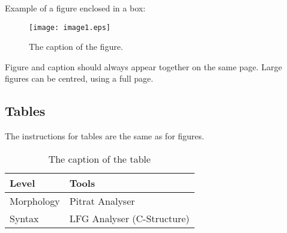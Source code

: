 \documentclass[10pt, a4paper]{article}
\begin{document}
Example of a figure enclosed in a box:

\begin{figure}[!h]
\begin{center}
\texttt{[image: image1.eps]} 
\caption{The caption of the figure.}
\label{fig.1}
\end{center}
\end{figure}

Figure and caption should always appear together on the same page. Large figures
can be centred, using a full page.

\subsection{Tables}

The instructions for tables are the same as for figures.
%
\begin{table}[!h]
\begin{center}
\begin{tabular}{|l|l|}

      \hline
      Level&Tools\\
      \hline\hline
      Morphology & Pitrat Analyser\\
      Syntax & LFG Analyser (C-Structure)\\
      \hline

\end{tabular}
\caption{The caption of the table}
 \end{center}
\end{table}

%
%
%
%
%
\end{document}

